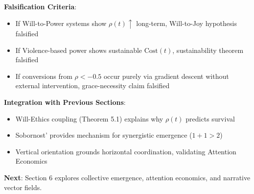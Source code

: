 \documentclass[11pt,a4paper]{article}
\theoremstyle{definition}
\theoremstyle{remark}
\begin{document}
\begin{small}
\begin{enumerate}
\begin{mdframed}[backgroundcolor=green!10,linewidth=2pt,linecolor=green!70!black]
\textbf{Falsification Criteria}:
\begin{itemize}[nosep]
    \item If Will-to-Power systems show \(\rho(t) \uparrow\) long-term, Will-to-Joy hypothesis falsified
    \item If Violence-based power shows sustainable \(\text{Cost}(t)\), sustainability theorem falsified
    \item If conversions from \(\rho < -0.5\) occur purely via gradient descent without external intervention, grace-necessity claim falsified
\end{itemize}

\textbf{Integration with Previous Sections}:
\begin{itemize}[nosep]
    \item Will-Ethics coupling (Theorem 5.1) explains why \(\rho(t)\) predicts survival
    \item Sobornost' provides mechanism for synergistic emergence (\(1+1>2\))
    \item Vertical orientation grounds horizontal coordination, validating Attention Economics
\end{itemize}

\textbf{Next}: Section 6 explores collective emergence, attention economics, and narrative vector fields.
\end{mdframed}

\begin{figure}[H]
\centering
{}
\end{figure}
\end{enumerate}
\end{small}
\end{document}
